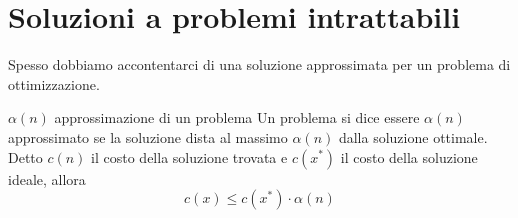 \section{Soluzioni a problemi intrattabili}

Spesso dobbiamo accontentarci di una soluzione approssimata per un problema di ottimizzazione.
\begin{definizione}{$\alpha\left(n\right) $ approssimazione di un problema}
	Un problema si dice essere $ \alpha \left(n\right) $ approssimato se la soluzione dista al massimo $ \alpha\left(n\right) $ dalla soluzione ottimale. Detto $ c\left(n\right) $ il costo della soluzione trovata e $ c\left(x^{*}\right) $ il costo della soluzione ideale, allora
	\[
		c\left(x\right) \leq c\left(x^{*}\right) \cdot \alpha\left(n\right)
	\]
\end{definizione}
